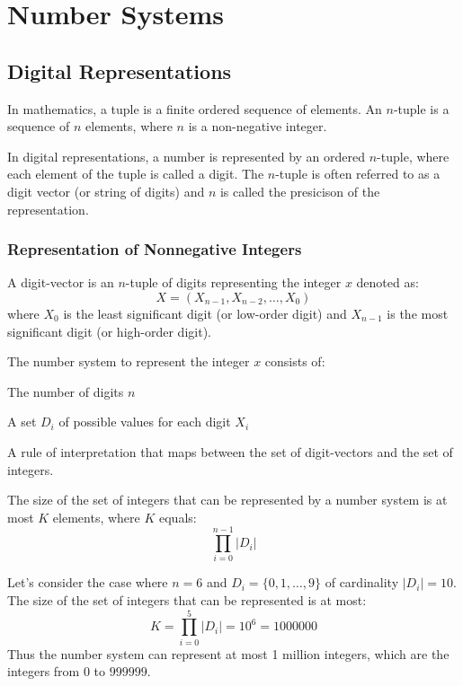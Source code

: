 \chapter{Number Systems}

\section{Digital Representations}

\begin{definition}[Tuple]
    In mathematics, a tuple is a finite ordered sequence of elements. An $n$-tuple is a sequence of $n$ elements, where $n$ is a non-negative integer.
\end{definition}
In digital representations, a number is represented by an ordered $n$-tuple, where each element of the tuple is called a digit. The $n$-tuple is often referred to as a digit vector (or string of digits) and $n$ is called the presicison of the representation.

\subsection{Representation of Nonnegative Integers}
\begin{definition}
    A digit-vector is an $n$-tuple of digits representing the integer $x$ denoted as:
    \[
        X = (X_{n-1}, X_{n-2}, \ldots, X_0)
    \]
    where $X_0$ is the least significant digit (or low-order digit) and $X_{n-1}$ is the most significant digit (or high-order digit).
\end{definition}
The number system to represent the integer $x$ consists of:
\begin{citemize}
    \item The number of digits $n$
    \item A set $D_i$ of possible values for each digit $X_i$
    \item A rule of interpretation that maps between the set of digit-vectors and the set of integers.
\end{citemize}
The size of the set of integers that can be represented by a number system is at most $K$ elements, where $K$ equals:
\[
    \prod_{i = 0}^{n -1} |D_i|
\]

\begin{eg}
    Let's consider the case where $n = 6$ and $D_i = \{0,1, \ldots, 9\}$ of cardinality $|D_i| = 10$. The size of the set of integers that can be represented is at most:
    \[
        K = \prod_{i = 0}^{5} |D_i| = 10^6 = 1000000
    \]
    Thus the number system can represent at most 1 million integers, which are the integers from $0$ to $999999$.
\end{eg}

